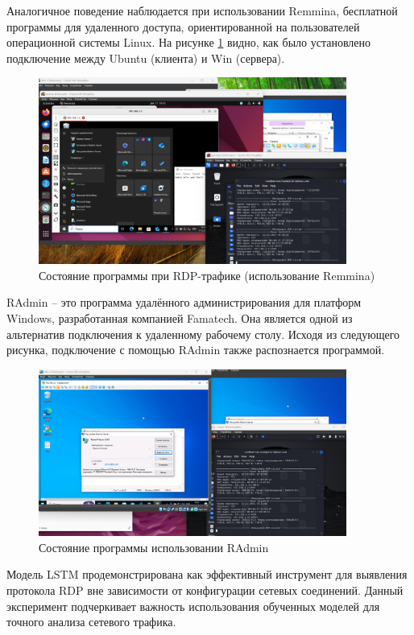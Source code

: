 \documentclass[bachelor, och, coursework]{SCWorks}
\begin{document}
Аналогичное поведение наблюдается при использовании Remmina, бесплатной программы для удаленного доступа, ориентированной 
на пользователей операционной системы Linux. На рисунке \ref{remmina1} видно, как было установлено подключение между Ubuntu 
(клиента) и Win (сервера).

\begin{figure}[H]
  \centering
  \includegraphics[width=0.9\textwidth]{pics/10remmina.png}
  \caption{Состояние программы при RDP-трафике (использование Remmina)}
  \label{remmina1}
\end{figure}


RAdmin -- это программа удалённого администрирования для платформ Windows, разработанная компанией Famatech. Она 
является одной из альтернатив подключения к удаленному рабочему столу. Исходя из следующего рисунка, подключение с помощью RAdmin
также распознается программой.


\begin{figure}[H]
  \centering
  \includegraphics[width=0.9\textwidth]{pics/11radmin.png}
  \caption{Состояние программы использовании RAdmin}
  \label{radmin1}
\end{figure}

Модель LSTM продемонстрирована как эффективный инструмент для выявления протокола RDP вне зависимости от конфигурации 
сетевых соединений. Данный эксперимент подчеркивает важность использования обученных моделей для точного анализа сетевого трафика.
\end{document}
